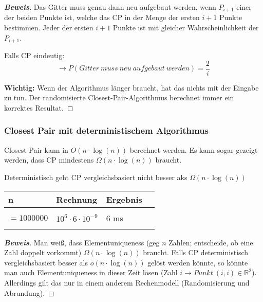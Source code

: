 \documentclass{scrartcl}%
\begin{document}
    \begin{proof}[\textbf{Beweis}]
        Das Gitter muss genau dann neu aufgebaut werden, wenn $P_{i+1}$
        einer der beiden Punkte ist, welche das CP in der Menge der ersten $i+1$ Punkte bestimmen.
        Jeder der ersten $i+1$ Punkte ist mit gleicher Wahrscheinlichkeit der $P_{i+1}$.

        Falls CP eindeutig:
        \begin{equation*}
            \rightarrow P(Gitter\ muss\ neu\ aufgebaut\ werden) = \frac{2}{i}
        \end{equation*}

        \textbf{\textsf{Wichtig:}} Wenn der Algorithmus länger braucht, hat das nichts mit der Eingabe zu tun.
        Der randomisierte Closest-Pair-Algorithmus berechnet immer ein korrektes Resultat.

    \end{proof}

    \subsubsection*{Closest Pair mit deterministischem Algorithmus}
    \label{subsec:closestPairmitdeterministischemAlgorithmus}
    Closest Pair kann in $O(n \cdot \log(n))$ berechnet werden.
    Es kann sogar gezeigt werden, dass CP mindestens $\Omega(n \cdot \log(n))$ braucht.

    Deterministisch geht CP vergleichsbasiert nicht besser aks $\Omega(n \cdot \log(n))$

    \begin{table}[!ht]
        \centering
        \begin{tabular}{llll}
            \textbf{\textsf{n}} & \textbf{\textsf{Rechnung}} & \textbf{\textsf{Ergebnis}}\\
            \hline \\
            $=1000000   $ & $10^6 \cdot 6 \cdot  10^{-9}$   & 6 ms \\
            \hline \\
        \end{tabular}
    \end{table}

    \begin{proof}[\textbf{Beweis}]
        Man weiß, dass Elementuniqueness (geg $n$ Zahlen; entscheide, ob eine Zahl doppelt vorkommt)
        $\Omega(n \cdot \log(n))$ braucht.
        Falls CP deterministisch vergleichsbasiert besser als $o(n \cdot \log(n))$
        gelöst werden könnte, so könnte man auch Elementuniqueness in dieser Zeit lösen
        (Zahl $i \rightarrow Punkt \ (i, i) \in \mathbb{R}^2$). Allerdings gilt das nur in einem
        anderem Rechenmodell (Randomisierung und Abrundung).

    \end{proof}
\end{document}
